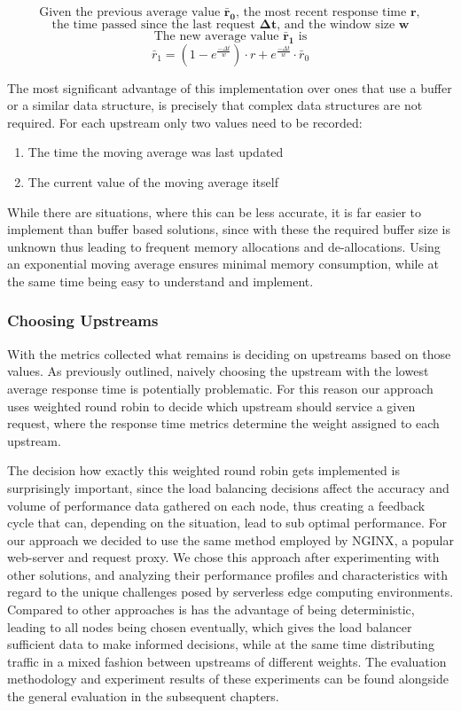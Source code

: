 \[\text{Given the previous average value } \mathbf{\bar{r}_{0}}\text{, the most recent response time } \mathbf{r}{,}\]
\[\text{the time passed since the last request }\mathbf{\Delta t} \text{, and the window size }\mathbf{w}\]
\[\text{The new average value }\mathbf{\bar{r}_{1}} \text{ is}\]
\[\bar{r}_{1} = (1 - e^{\frac{-\Delta t}{w}}) \cdot r + e^{\frac{-\Delta t}{w}} \cdot \bar{r}_{0}\]

The most significant advantage of this implementation over ones that use a buffer or a similar data structure, is precisely that complex data structures are not required. For each upstream only two values need to be recorded:
\begin{enumerate}
    \item The time the moving average was last updated
    \item The current value of the moving average itself
\end{enumerate}
While there are situations, where this can be less accurate, it is far easier to implement than buffer based solutions, since with these the required buffer size is unknown thus leading to frequent memory allocations and de-allocations.
Using an exponential moving average ensures minimal memory consumption, while at the same time being easy to understand and implement.

\subsubsection{Choosing Upstreams}
With the metrics collected what remains is deciding on upstreams based on those values. As previously outlined, naively choosing the upstream with the lowest average response time is potentially problematic.
For this reason our approach uses weighted round robin to decide which upstream should service a given request, where the response time metrics determine the weight assigned to each upstream.

The decision how exactly this weighted round robin gets implemented is surprisingly important, since the load balancing decisions affect the accuracy and volume of performance data gathered on each node, thus creating a feedback cycle that can, depending on the situation, lead to sub optimal performance.
For our approach we decided to use the same method employed by NGINX\cite{nginx}, a popular web-server and request proxy.
We chose this approach after experimenting with other solutions, and analyzing their performance profiles and characteristics with regard to the unique challenges posed by serverless edge computing environments.
Compared to other approaches is has the advantage of being deterministic, leading to all nodes being chosen eventually, which gives the load balancer sufficient data to make informed decisions, while at the same time distributing traffic in a mixed fashion between upstreams of different weights.
The evaluation methodology and experiment results of these experiments can be found alongside the general evaluation in the subsequent chapters.

